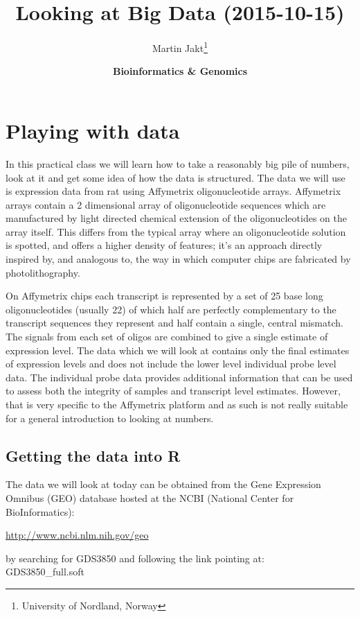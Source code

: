 \documentclass[11pt]{article}
\author{Martin Jakt\thanks{University of Nordland, Norway}}
\date{\textbf{Bioinformatics \& Genomics}}
\title{\textbf{Looking at Big Data} (2015-10-15)}
\begin{document}
\maketitle

\section{Playing with data}
\label{sec-1}
In this practical class we will learn how to take a reasonably
big pile of numbers, look at it and get some idea of how the
data is structured. The data we will use is expression data from
rat using Affymetrix oligonucleotide arrays. Affymetrix arrays contain
a 2 dimensional array of oligonucleotide sequences which are manufactured
by light directed chemical extension of the oligonucleotides on the
array itself. This differs from the typical array where an oligonucleotide
solution is spotted, and offers a higher density of features; it's
an approach directly inspired by, and analogous to, the way in which
computer chips are fabricated by photolithography.

On Affymetrix chips each transcript is represented by a set of 25 base
long oligonucleotides (usually 22) of which half are perfectly 
complementary to the transcript sequences they represent and half contain
a single, central mismatch. The signals from each set of oligos
are combined to give a single estimate of expression level. The data which
we will look at contains only the final estimates of expression levels and
does not include the lower level individual probe level data. The individual
probe data provides additional information that can be used to assess both
the integrity of samples and transcript level estimates. However, that
is very specific to the Affymetrix platform and as such is not really
suitable for a general introduction to looking at numbers.

\subsection{Getting the data into R}
\label{sec-1-1}
The data we will look at today can be obtained from the
Gene Expression Omnibus (GEO) database hosted at the
NCBI (National Center for BioInformatics):

\url{http://www.ncbi.nlm.nih.gov/geo}

by searching for GDS3850 and following the link pointing at:\\
GDS3850\_full.soft\\
\end{document}
